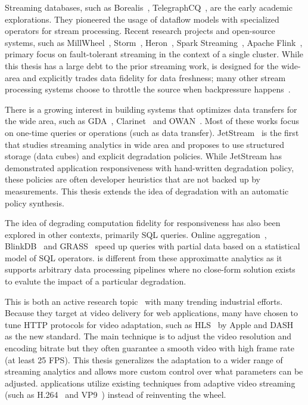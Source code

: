 \documentclass[thesis.tex]{subfiles}
\begin{document}
 Streaming databases, such as
Borealis~\cite{abadi2005design},
TelegraphCQ~\cite{chandrasekaran2003telegraphcq}, are the early academic
explorations. They pioneered the usage of dataflow models with specialized
operators for stream processing. Recent research projects and open-source
systems, such as MillWheel~\cite{akidau2013millwheel},
Storm~\cite{toshniwal2014storm}, Heron~\cite{kulkarni2015twitter}, Spark
Streaming~\cite{zaharia2012discretized}, Apache Flink~\cite{carbone2015apache},
primary focus on fault-tolerant streaming in the context of a single
cluster. While this thesis has a large debt to the prior streaming work,
\sysname{} is designed for the wide-area and explicitly trades data fidelity for
data freshness; many other stream processing systems choose to throttle the
source when backpressure happens~\cite{kulkarni2015twitter}.

 There is a growing interest in building systems that optimizes
data transfers for the wide area, such as GDA~\cite{pu2015low},
Clarinet~\cite{viswanathan2016clarinet} and OWAN~\cite{jin2016optimizing}.  Most
of these works focus on one-time queries or operations (such as data
transfer). JetStream~\cite{rabkin2014aggregation} is the first that studies
streaming analytics in wide area and proposes to use structured storage (data
cubes) and explicit degradation policies. While JetStream has demonstrated
application responsiveness with hand-written degradation policy, these policies
are often developer heuristics that are not backed up by measurements. This
thesis extends the idea of degradation with an automatic policy synthesis.

 The idea of degrading computation fidelity for
responsiveness has also been explored in other contexts, primarily SQL
queries. Online aggregation~\cite{hellerstein1997online},
BlinkDB~\cite{agarwal2013blinkdb} and GRASS~\cite{ananthanarayanan2014grass}
speed up queries with partial data based on a statistical model of SQL
operators. \sysname{} is different from these approximatte analytics as it
supports arbitrary data processing pipelines where no close-form solution exists
to evalute the impact of a particular degradation.

 This is both an active research
topic~\cite{sun2016cs2p, yin2015control} with many trending industrial efforts.
Because they target at video delivery for web applications, many have chosen to
tune HTTP protocols for video adaptation, such as HLS~\cite{pantos2016http} by
Apple and DASH~\cite{michalos2012dynamic} as the new standard. The main
technique is to adjust the video resolution and encoding bitrate but they often
guarantee a smooth video with high frame rate (at least 25 FPS). This thesis
generalizes the adaptation to a wider range of streaming analytics and allows
more custom control over what parameters can be adjusted. \sysname{}
applications utilize existing techniques from adaptive video streaming (such as
H.264~\cite{richardson2011h} and VP9~\cite{grange2016vp9}) instead of
reinventing the wheel.
\end{document}
